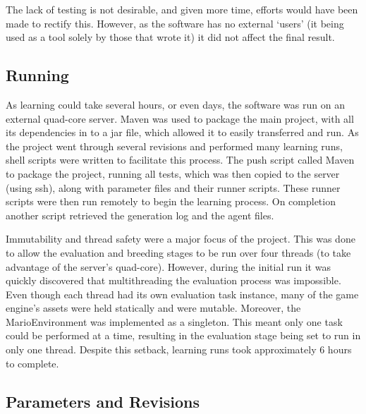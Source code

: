 The lack of testing is not desirable, and given more time, efforts would have been made to rectify this. However, as the software has no external `users' (it being used as a tool solely by those that wrote it) it did not affect the final result.



\subsection{Running}
\label{subsec:learnrunning}

As learning could take several hours, or even days, the software was run on an external quad-core server. Maven was used to package the main project, with all its dependencies in to a jar file, which allowed it to easily transferred and run. As the project went through several revisions and performed many learning runs, shell scripts were written to facilitate this process. The push script called Maven to package the project, running all tests, which was then copied to the server (using ssh), along with parameter files and their runner scripts. These runner scripts were then run remotely to begin the learning process. On completion another script retrieved the generation log and the agent files.

Immutability and thread safety were a major focus of the project. This was done to allow the evaluation and breeding stages to be run over four threads (to take advantage of the server's quad-core). However, during the initial run it was quickly discovered that multithreading the evaluation process was impossible. Even though each thread had its own evaluation task instance, many of the game engine's assets were held statically and were mutable. Moreover, the MarioEnvironment was implemented as a singleton. This meant only one task could be performed at a time, resulting in the evaluation stage being set to run in only one thread. Despite this setback, learning runs took approximately 6 hours to complete.


\subsection{Parameters and Revisions}
\label{subsec:learnparam}

